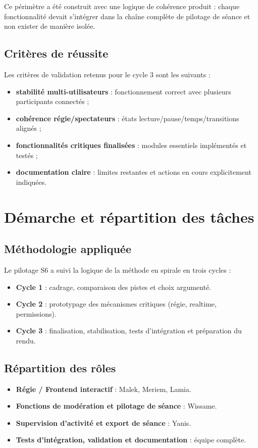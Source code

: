 \documentclass[11pt,a4paper]{report}
\begin{document}
Ce périmètre a été construit avec une logique de cohérence produit : chaque fonctionnalité devait s'intégrer dans la chaîne complète de pilotage de séance et non exister de manière isolée.

\section{Critères de réussite}
Les critères de validation retenus pour le cycle 3 sont les suivants :
\begin{itemize}
    \item \textbf{stabilité multi-utilisateurs} : fonctionnement correct avec plusieurs participants connectés ;
    \item \textbf{cohérence régie/spectateurs} : états lecture/pause/temps/transitions alignés ;
    \item \textbf{fonctionnalités critiques finalisées} : modules essentiels implémentés et testés ;
    \item \textbf{documentation claire} : limites restantes et actions en cours explicitement indiquées.
\end{itemize}

\chapter{Démarche et répartition des tâches}
\section{Méthodologie appliquée}
Le pilotage S6 a suivi la logique de la méthode en spirale en trois cycles :
\begin{itemize}
    \item \textbf{Cycle 1} : cadrage, comparaison des pistes et choix argumenté.
    \item \textbf{Cycle 2} : prototypage des mécanismes critiques (régie, realtime, permissions).
    \item \textbf{Cycle 3} : finalisation, stabilisation, tests d'intégration et préparation du rendu.
\end{itemize}

\section{Répartition des rôles}
\begin{itemize}
    \item \textbf{Régie / Frontend interactif} : Malek, Meriem, Lamia.
    \item \textbf{Fonctions de modération et pilotage de séance} : Wissame.
    \item \textbf{Supervision d'activité et export de séance} : Yanis.
    \item \textbf{Tests d'intégration, validation et documentation} : équipe complète.
\end{itemize}
\end{document}
